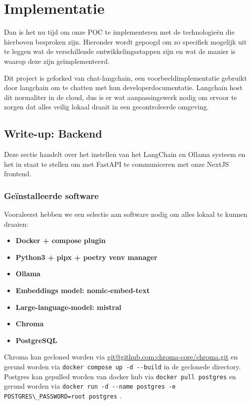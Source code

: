 \chapter{Implementatie}
\label{ch:implementation}
Dan is het nu tijd om onze POC te implementeren met de technologieën die hierboven besproken zijn.
Hieronder wordt gepoogd om zo specifiek mogelijk uit te leggen wat de verschillende ontwikkelingsstappen zijn en wat de manier is waarop deze zijn geïmplementeerd.

Dit project is geforked van chat-langchain, een voorbeeldimplementatie gebruikt door langchain om te chatten met hun developerdocumentatie.
Langchain host dit normaliter in de cloud, dus is er wat aanpassingswerk nodig om ervoor te zorgen dat alles veilig lokaal draait in een gecontroleerde omgeving.

\section{Write-up: Backend}
Deze sectie handelt over het instellen van het LangChain en Ollama systeem en het in staat te stellen om met FastAPI te communiceren met onze NextJS frontend.

\subsection{Geïnstalleerde software}
Vooraleerst hebben we een selectie aan software nodig om alles lokaal te kunnen draaien:
\begin{itemize}
	\item \textbf{Docker + compose plugin}
	\item \textbf{Python3 + pipx + poetry venv manager}
	\item \textbf{Ollama}
	\item \textbf{Embeddings model: nomic-embed-text}
	\item \textbf{Large-language-model: mistral}
	\item \textbf{Chroma}
	\item \textbf{PostgreSQL}
\end{itemize}

Chroma kan gecloned worden via \url{git@github.com:chroma-core/chroma.git} en gerund worden via \lstinline{docker compose up -d --build} in de geclonede directory. \\
Postgres kan gepulled worden van docker hub via \lstinline{docker pull postgres} en gerund worden via \lstinline{docker run -d --name postgres -e POSTGRES\_PASSWORD=root postgres} . \\

